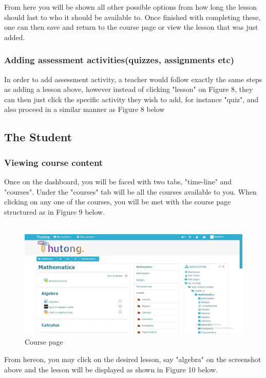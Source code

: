 \documentclass[12pt,a4paper]{article}
\begin{document}
		 
		 		From here you will be shown all other possible options from how long the lesson should last to who it should be available to. Once finished with completing these, one can then save and return to the course page or view the lesson that was just added. 
		 	
		 	\subsubsection{Adding assessment activities(quizzes, assignments etc)}
		 		In order to add assessment activity, a teacher would follow exactly the same steps as adding a lesson above, however instead of clicking "lesson" on Figure 8, they can then just click the specific activity they wish to add, for instance "quiz",  and also proceed in a similar manner as Figure 8 below
		 		
		 \subsection{The Student}
		 	\subsubsection{Viewing course content}
			 	Once on the dashboard, you will be faced with two tabs, "time-line" and "courses". Under the "courses" tab will be all the courses available to you. When clicking on any one of the courses, you will be met with the course page structured as in Figure 9 below.\\\\
			 	\begin{figure}[h]
			 			\centering
			 	 		\includegraphics[width=1\textwidth]{images/courseHome.JPG}
			 		 	\caption{Course page}
			 			\label{Figure 9}
			 	\end{figure}
		 		From hereon, you may click on the desired lesson, say "algebra" on the screenshot above and the lesson will be displayed as shown in Figure 10 below.
			 	
\end{document}
